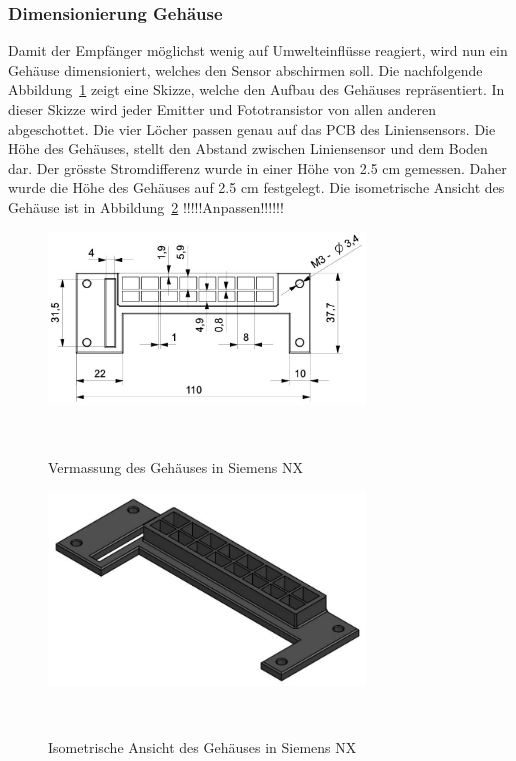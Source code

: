 \documentclass[main.tex]{subfiles} %
\begin{document}

\subsubsection*{Dimensionierung Gehäuse}
Damit der Empfänger möglichst wenig auf Umwelteinflüsse reagiert, wird nun ein 
Gehäuse dimensioniert, welches den Sensor abschirmen soll. Die nachfolgende 
Abbildung~\ref{fig:Gehaeuse_Vermasst} zeigt eine Skizze, welche den Aufbau des Gehäuses repräsentiert.
In dieser Skizze wird jeder Emitter und Fototransistor von allen anderen abgeschottet. Die vier Löcher
passen genau auf das PCB des Liniensensors. Die Höhe des Gehäuses, stellt den Abstand zwischen Liniensensor
und dem Boden dar. Der grösste Stromdifferenz wurde in einer Höhe von 2.5 cm gemessen. Daher wurde die Höhe
des Gehäuses auf 2.5 cm festgelegt.
Die isometrische Ansicht des Gehäuse ist in Abbildung~\ref{fig:Gehaeuse_Isometrisch} !!!!!Anpassen!!!!!!



\begin{figure}[H]
    \centering
    \includegraphics[width=0.75\textwidth]{fig_Strecke_Tracken/Gehaeuse_Vermasst.pdf}
    \caption{Vermassung des Gehäuses in Siemens NX}~\label{fig:Gehaeuse_Vermasst}
\end{figure}

\begin{figure}[H]
    \centering
    \includegraphics[width=0.75\textwidth]{fig_Strecke_Tracken/Gehaeuse_Isometrisch.pdf}
    \caption{Isometrische Ansicht des Gehäuses in Siemens NX}~\label{fig:Gehaeuse_Isometrisch}
\end{figure}
\end{document}
